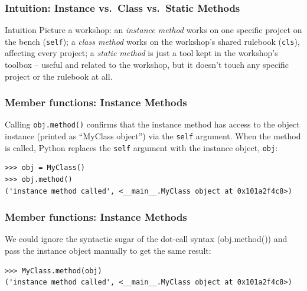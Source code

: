 \begin{frame}[fragile]\frametitle{Intuition: Instance vs.\ Class vs.\ Static Methods}
\begin{block}{Intuition}
Picture a workshop: an \emph{instance method} works on one specific project on the bench
(\texttt{self}); a \emph{class method} works on the workshop's shared rulebook (\texttt{cls}),
affecting every project; a \emph{static method} is just a tool kept in the workshop's toolbox --
useful and related to the workshop, but it doesn't touch any specific project or the rulebook at
all.
\end{block}
\end{frame}


\begin{frame}[fragile]\frametitle{Member functions: Instance Methods}

Calling \lstinline|obj.method()| confirms that the instance method has access to the object
instance (printed as ``MyClass object'') via the \texttt{self} argument. When the method is
called, Python replaces the \texttt{self} argument with the instance object, \texttt{obj}:
\begin{lstlisting}
>>> obj = MyClass()
>>> obj.method()
('instance method called', <__main__.MyClass object at 0x101a2f4c8>)
\end{lstlisting}

\end{frame}

\begin{frame}[fragile]\frametitle{Member functions: Instance Methods}

We could ignore the syntactic sugar of the dot-call syntax (obj.method()) and pass the instance object manually to get the same result:

\begin{lstlisting}
>>> MyClass.method(obj)
('instance method called', <__main__.MyClass object at 0x101a2f4c8>)
\end{lstlisting}

\end{frame}

